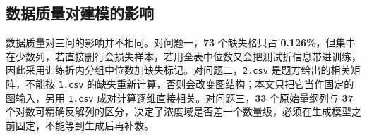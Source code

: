 \subsection{数据质量对建模的影响}

数据质量对三问的影响并不相同。对问题一，\textbf{73} 个缺失格只占 \textbf{0.126\%}，但集中在少数列，若直接删行会损失样本，若用全表中位数又会把测试折信息带进训练，因此采用训练折内分组中位数加缺失标记。对问题二，\texttt{2.csv} 是题方给出的相关矩阵，不能按 \texttt{1.csv} 的缺失重新计算，否则会改变图结构；本文只把它当作固定的图输入，另用 \texttt{1.csv} 成对计算逐维直接相关。对问题三，\textbf{33} 个原始量纲列与 \textbf{37} 个对数可精确反解列的区分，决定了浓度域是否差一个数量级，必须在生成模型之前固定，不能等到生成后再补救。
